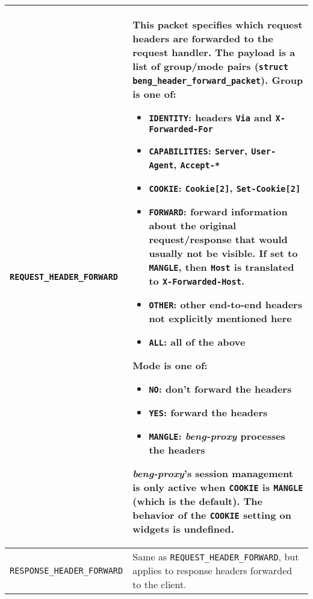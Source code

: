 \documentclass[a4paper,12pt]{article}
\begin{document}
\begin{longtable}{|l|p{8cm}|}
\\

\hline

\label{tfwdheader}
\verb|REQUEST_HEADER_FORWARD| &

This packet specifies which request headers are forwarded to the
request handler.  The payload is a list of group/mode pairs
(\texttt{struct beng\_header\_forward\_packet}).  Group is one of:

\begin{itemize}
\item \texttt{IDENTITY}: headers \texttt{Via} and
  \texttt{X-Forwarded-For}
\item \texttt{CAPABILITIES}: \texttt{Server}, \texttt{User-Agent},
  \texttt{Accept-*}
\item \texttt{COOKIE}: \texttt{Cookie[2]}, \texttt{Set-Cookie[2]}

\item \texttt{FORWARD}: forward information about the original
  request/response that would usually not be visible.  If set to
  \verb|MANGLE|, then \texttt{Host} is translated to
  \texttt{X-Forwarded-Host}.

\item \texttt{OTHER}: other end-to-end headers not explicitly
  mentioned here
\item \texttt{ALL}: all of the above
\end{itemize}

Mode is one of:

\begin{itemize}
\item \texttt{NO}: don't forward the headers
\item \texttt{YES}: forward the headers
\item \texttt{MANGLE}: \emph{beng-proxy} processes the headers
\end{itemize}

\emph{beng-proxy}'s session management is only active when
\texttt{COOKIE} is \texttt{MANGLE} (which is the default).  The
behavior of the \texttt{COOKIE} setting on widgets is undefined.

\\

\hline

\verb|RESPONSE_HEADER_FORWARD| &

Same as \verb|REQUEST_HEADER_FORWARD|, but applies to response
headers forwarded to the client. \\

\hline


\end{longtable}
\end{document}
